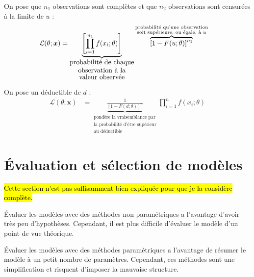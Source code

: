 \documentclass[10pt, french]{article}
\begin{document}
\begin{multicols*}{2}
\begin{definitionNOHFILLprop}
On pose que $n_{1}$ observations sont complètes et que $n_{2}$ observations sont censurées à la limite de $u$ :
\begin{align*}
	\mathcal{L}(\theta; \bm{x})
	&=	\underbrace{\left[\prod^{n_{1}}_{i	=	1} f(x_{i}; \theta) \right]}_{\shortstack{probabilité de chaque\\ observation à la\\ valeur observée}} \overbrace{\left[1	-	F(u; \theta)\right]^{n_{2}}}^{\substack{\text{probabilité qu'une observation}\\ \text{soit supérieure, ou égale, à $u$}}}
\end{align*}
\end{definitionNOHFILLprop}

\begin{definitionNOHFILLprop}
On pose un déductible de $d$ : 
\begin{align*}
	\mathcal{L}(\theta; \bm{x})
	&=	\underbrace{\frac{1}{\left[1	-	F(d; \theta)\right]^{n}}}_{\substack{\text{pondère la vraisemblance par}\\ \text{la probabilité d'être supérieur}\\ \text{au déductible}}} \prod^{n}_{i	=	1} f(x_{i}; \theta)
\end{align*}
\end{definitionNOHFILLprop}



\pagebreak
\section{Évaluation et sélection de modèles}
\hl{Cette section n'est pas suffisamment bien expliquée pour que je la considère complète.}\\
\begin{rappel_enhanced}[Contexte]
Évaluer les modèles avec des méthodes non paramétriques a l'avantage d'avoir très peu d'hypothèses. Cependant, il est plus difficile d'évaluer le modèle d'un point de vue théorique.

Évaluer les modèles avec des méthodes paramétriques a l'avantage de résumer le modèle à un petit nombre de paramètres. Cependant, ces méthodes sont une simplification et risquent d'imposer la mauvaise structure.
\end{rappel_enhanced}


\end{multicols*}
\end{document}
